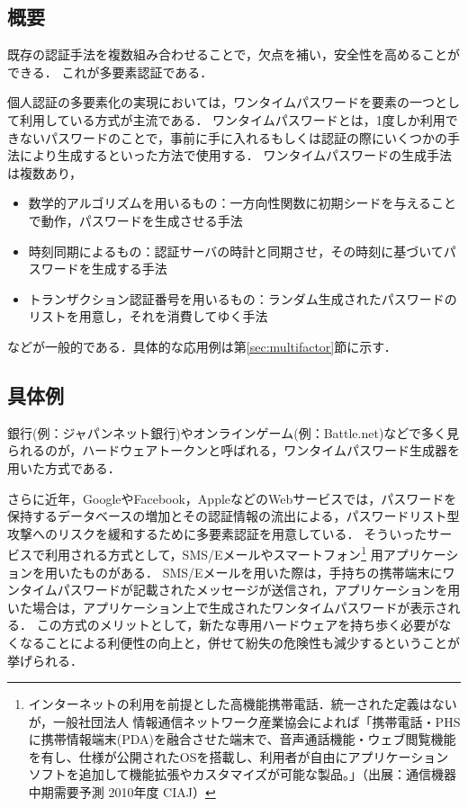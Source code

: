 \subsection{概要}
既存の認証手法を複数組み合わせることで，欠点を補い，安全性を高めることができる．
これが多要素認証である．

個人認証の多要素化の実現においては，ワンタイムパスワードを要素の一つとして利用している方式が主流である\cite{DBLP:journals/corr/CristofaroDFN13}．
ワンタイムパスワードとは，1度しか利用できないパスワードのことで，事前に手に入れるもしくは認証の際にいくつかの手法により生成するといった方法で使用する．
ワンタイムパスワードの生成手法は複数あり，
\begin{itemize}
  \item 数学的アルゴリズムを用いるもの：一方向性関数に初期シードを与えることで動作，パスワードを生成させる手法
  \item 時刻同期によるもの：認証サーバの時計と同期させ，その時刻に基づいてパスワードを生成する手法
  \item トランザクション認証番号を用いるもの：ランダム生成されたパスワードのリストを用意し，それを消費してゆく手法
\end{itemize}
などが一般的である．具体的な応用例は第\ref{sec:multifactor}節に示す．

\subsection{具体例}
銀行(例：ジャパンネット銀行\cite{japannet2F})やオンラインゲーム(例：Battle.net\cite{battlenet2F})などで多く見られる\cite{DBLP:journals/corr/CristofaroDFN13}\cite{Yamane:2011:SOG:2021672.2021743}のが，ハードウェアトークンと呼ばれる，ワンタイムパスワード生成器を用いた方式である．

さらに近年，GoogleやFacebook，AppleなどのWebサービスでは，パスワードを保持するデータベースの増加とその認証情報の流出による，パスワードリスト型攻撃へのリスク\cite{ipa07Outline}を緩和する\cite{lifehacker2F}ために多要素認証を用意している．
そういったサービスで利用される方式として，SMS/Eメールやスマートフォン\footnote{インターネットの利用を前提とした高機能携帯電話．統一された定義はないが，一般社団法人 情報通信ネットワーク産業協会によれば「携帯電話・PHSに携帯情報端末(PDA)を融合させた端末で、音声通話機能・ウェブ閲覧機能を有し、仕様が公開されたOSを搭載し、利用者が自由にアプリケーションソフトを追加して機能拡張やカスタマイズが可能な製品。」（出展：通信機器中期需要予測 2010年度 CIAJ）} 用アプリケーションを用いたものがある．
SMS/Eメールを用いた際は，手持ちの携帯端末にワンタイムパスワードが記載されたメッセージが送信され，アプリケーションを用いた場合は，アプリケーション上で生成されたワンタイムパスワードが表示される．
この方式のメリットとして，新たな専用ハードウェアを持ち歩く必要がなくなることによる利便性の向上と，併せて紛失の危険性も減少するということが挙げられる．


